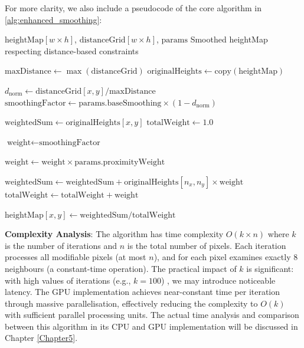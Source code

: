 For more clarity, we also include a pseudocode of the core algorithm in \ref{alg:enhanced_smoothing}:

\begin{algorithm}[H]
\caption{Enhanced Distance-Based Smoothing}
\label{alg:enhanced_smoothing}
\begin{algorithmic}[1]
\Require $\text{heightMap}[w \times h]$, $\text{distanceGrid}[w \times h]$, $\text{params}$
\Ensure Smoothed heightMap respecting distance-based constraints

\State $\text{maxDistance} \gets \max(\text{distanceGrid})$
    \State $\text{originalHeights} \gets \text{copy}(\text{heightMap})$
    
        \State $d_{\text{norm}} \gets \text{distanceGrid}[x,y] / \text{maxDistance}$
        \State $\text{smoothingFactor} \gets \text{params.baseSmoothing} \times (1 - d_{\text{norm}})$
        
        \State $\text{weightedSum} \gets \text{originalHeights}[x,y]$ 
        \State $\text{totalWeight} \gets 1.0$
        
            \State $\text{weight} \gets \text{smoothingFactor}$
            
                \State $\text{weight} \gets \text{weight} \times \text{params.proximityWeight}$
            \EndIf
            
            \State $\text{weightedSum} \gets \text{weightedSum} + \text{originalHeights}[n_x, n_y] \times \text{weight}$
            \State $\text{totalWeight} \gets \text{totalWeight} + \text{weight}$
        \EndFor
        
        \State $\text{heightMap}[x,y] \gets \text{weightedSum} / \text{totalWeight}$
    \EndFor
\EndFor
\end{algorithmic}
\end{algorithm}

\textbf{Complexity Analysis}: The algorithm has time complexity $O(k \times n)$ where $k$ is the number of iterations and $n$ is the total number of pixels. Each iteration processes all modifiable pixels (at most $n$), and for each pixel examines exactly 8 neighbours (a constant-time operation). The practical impact of $k$ is significant: with high values of iterations (e.g., $k = 100$) , we may introduce noticeable latency. The GPU implementation achieves near-constant time per iteration through massive parallelisation, effectively reducing the complexity to $O(k)$ with sufficient parallel processing units. The actual time analysis and comparison between this algorithm in its CPU and GPU implementation will be discussed in Chapter \ref{Chapter5}.

